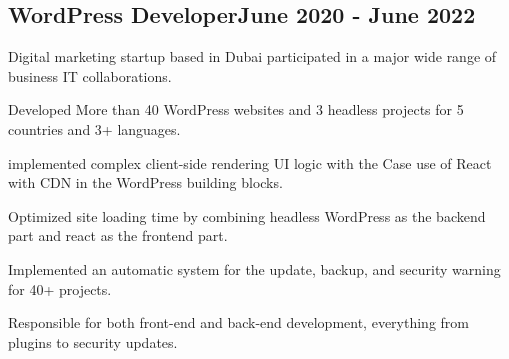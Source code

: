 \subsection{{WordPress Developer\hfill June 2020 - June 2022}}
\begin{zitemize}
             \item{Digital marketing startup based in Dubai participated in a major wide range of business IT collaborations.}
             \item{
                Developed More than 40 WordPress websites and 3 headless projects for 5 countries and 3+ languages.}
             \item{implemented complex client-side rendering UI logic with the Case use of React with CDN in the WordPress building blocks.}
             \item{Optimized site loading time by combining headless WordPress as the backend part and react as the frontend part.}
             \item{
                Implemented an automatic system for the update, backup, and security warning for 40+ projects.}
             \item{
               Responsible for both front-end and back-end development, everything from plugins to security updates.}
\end{zitemize}


